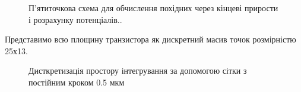 \documentclass[14pt,a4paper]{scrartcl}
\begin{document}
\begin{center}
\begin{figure}[h]
\end{figure}
\end{center}

\begin{center}
\begin{figure}[h]
\caption{П'ятиточкова схема для обчислення похідних через кінцеві прирости і розрахунку потенціалів..}
\label{ris:image5}
\end{figure}
\end{center}

\newpage
Представимо всю площину транзистора як  дискретний масив точок розмірністю 25х13.

\begin{center}
\begin{figure}[h]
\caption[wec]{Дисткретизація простору інтегрування за допомогою сітки з постійним кроком 0.5 мкм\footnotemark}
\label{ris:image}
\end{figure}
\end{center}
\end{document}
